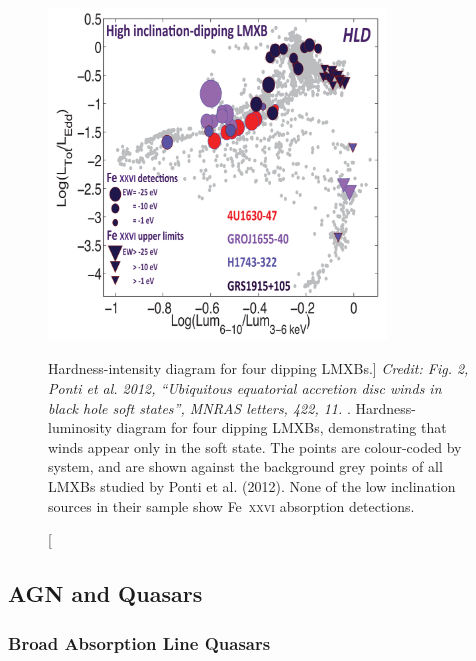 \begin{figure}
\centering
\includegraphics[width=0.8\textwidth]{figures/02-outflows/ponti_hid_dip.png}
\caption
[Hardness-intensity diagram for four dipping LMXBs.]
{
{\sl Credit: Fig. 2, Ponti et al. 2012, ``Ubiquitous equatorial accretion disc winds in black hole soft states'', MNRAS letters, 422, 11.
}. 
Hardness-luminosity diagram for four dipping LMXBs,
demonstrating that winds appear only in the soft state. 
The points are colour-coded by system, and are shown against the 
background grey points of all LMXBs studied by Ponti et al. (2012).
None of the low inclination sources in their sample show Fe~\textsc{xxvi}
absorption detections.
} 
\label{fig:ponti_hid}
\end{figure}


\subsection{AGN and Quasars}
\label{sec:agn_winds}

\subsubsection{Broad Absorption Line Quasars}
\label{sec:balqsos}

